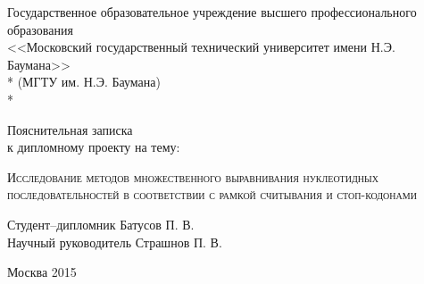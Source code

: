 \begin{titlepage}
\newpage

\begin{center}
Государственное образовательное учреждение высшего профессионального образования \\
\vspace{1cm}
\Large<<Московский государственный технический университет имени Н.Э. Баумана>> \\*
(МГТУ им. Н.Э. Баумана) \\*
\hrulefill
\end{center}


\vspace{8em}

\begin{center}
\Large Пояснительная записка \\ к дипломному проекту на тему:
\end{center}

\vspace{2.0em}

\begin{center}
	\Large
\textsc{Исследование методов множественного выравнивания нуклеотидных последовательностей в соответствии с рамкой считывания и стоп-кодонами}
\end{center}

\vspace{6em}

\begin{flushleft}
Студент--дипломник \hrulefill Батусов П. В. \\
\vspace{1.5em}
Научный руководитель \hrulefill Страшнов П. В.\\
\vspace{1.5em}
\end{flushleft}

\vspace{\fill}

\begin{center}
Москва 2015
\end{center}

\end{titlepage}